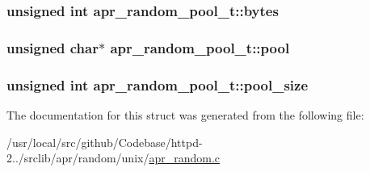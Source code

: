 \subsubsection[{\texorpdfstring{bytes}{bytes}}]{\setlength{\rightskip}{0pt plus 5cm}unsigned {\bf int} apr\+\_\+random\+\_\+pool\+\_\+t\+::bytes}\hypertarget{structapr__random__pool__t_ae6fd60ad6e0f71ffbe851baa476b6445}{}\label{structapr__random__pool__t_ae6fd60ad6e0f71ffbe851baa476b6445}
\subsubsection[{\texorpdfstring{pool}{pool}}]{\setlength{\rightskip}{0pt plus 5cm}unsigned char$\ast$ apr\+\_\+random\+\_\+pool\+\_\+t\+::pool}\hypertarget{structapr__random__pool__t_a26c534eeecf254ac703913e0367bfb37}{}\label{structapr__random__pool__t_a26c534eeecf254ac703913e0367bfb37}
\subsubsection[{\texorpdfstring{pool\+\_\+size}{pool_size}}]{\setlength{\rightskip}{0pt plus 5cm}unsigned {\bf int} apr\+\_\+random\+\_\+pool\+\_\+t\+::pool\+\_\+size}\hypertarget{structapr__random__pool__t_a5807af0013c3f5b60857a72dfb550b56}{}\label{structapr__random__pool__t_a5807af0013c3f5b60857a72dfb550b56}


The documentation for this struct was generated from the following file\+:\begin{DoxyCompactItemize}
\item 
/usr/local/src/github/\+Codebase/httpd-\/2../srclib/apr/random/unix/\hyperlink{apr__random_8c}{apr\+\_\+random.\+c}\end{DoxyCompactItemize}
